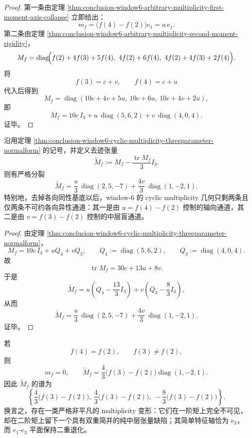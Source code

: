\begin{proof}
第一条由定理 \ref{thm:conclusion-window6-arbitrary-multiplicity-first-moment-axis-collapse} 立即给出：
\[
m_f=\bigl(f(4)-f(2)\bigr)e_1=u\,e_1.
\]
第二条由定理 \ref{thm:conclusion-window6-arbitrary-multiplicity-second-moment-rigidity}，
\[
M_f
=
\operatorname{diag}\!\Bigl(
f(2)+4f(3)+5f(4),\
4f(2)+6f(4),\
4f(2)+4f(3)+2f(4)
\Bigr).
\]
将
\[
f(3)=c+v,\qquad
f(4)=c+u
\]
代入后得到
\[
M_f
=
\operatorname{diag}(10c+4v+5u,\ 10c+6u,\ 10c+4v+2u),
\]
即
\[
M_f
=
10c\,I_3
+u\,\operatorname{diag}(5,6,2)
+v\,\operatorname{diag}(4,0,4).
\]
证毕。
\end{proof}

\begin{theorem}[去迹二阶矩的双通道分裂]\label{thm:conclusion-window6-cyclic-multiplicity-traceless-twochannel-splitting}
沿用定理 \ref{thm:conclusion-window6-cyclic-multiplicity-threeparameter-normalform} 的记号，并定义去迹张量
\[
\widetilde M_f:=M_f-\frac{\operatorname{tr}M_f}{3}I_3.
\]
则有严格分裂
\[
\widetilde M_f
=
\frac{u}{3}\,\operatorname{diag}(2,5,-7)
+\frac{4v}{3}\,\operatorname{diag}(1,-2,1).
\]
特别地，去掉各向同性基底以后，window-\(6\) 的 cyclic multiplicity 几何只剩两条且仅两条不可约各向异性通道：其一是由 \(u=f(4)-f(2)\) 控制的轴向通道，其二是由 \(v=f(3)-f(2)\) 控制的中层盲通道。
\end{theorem}

\begin{proof}
由定理 \ref{thm:conclusion-window6-cyclic-multiplicity-threeparameter-normalform}，
\[
M_f
=
10c\,I_3
+uQ_4
+vQ_3,
\qquad
Q_4:=\operatorname{diag}(5,6,2),
\qquad
Q_3:=\operatorname{diag}(4,0,4).
\]
故
\[
\operatorname{tr}M_f=30c+13u+8v.
\]
于是
\[
\widetilde M_f
=
u\!\left(Q_4-\frac{13}{3}I_3\right)
+v\!\left(Q_3-\frac{8}{3}I_3\right),
\]
从而
\[
\widetilde M_f
=
\frac{u}{3}\,\operatorname{diag}(2,5,-7)
+\frac{4v}{3}\,\operatorname{diag}(1,-2,1).
\]
证毕。
\end{proof}

\begin{corollary}[中层盲通道的双重简并]\label{cor:conclusion-window6-cyclic-multiplicity-middleblind-double-degeneracy}
若
\[
f(4)=f(2),\qquad f(3)\neq f(2),
\]
则
\[
m_f=0,
\qquad
\widetilde M_f
=
\frac{4}{3}\bigl(f(3)-f(2)\bigr)\operatorname{diag}(1,-2,1).
\]
因此 \(\widetilde M_f\) 的谱为
\[
\left\{
\frac{4}{3}\bigl(f(3)-f(2)\bigr),\
\frac{4}{3}\bigl(f(3)-f(2)\bigr),\
-\frac{8}{3}\bigl(f(3)-f(2)\bigr)
\right\}.
\]
换言之，存在一类严格非平凡的 multiplicity 变形：它们在一阶矩上完全不可见，却在二阶矩上留下一个具有双重简并的纯中层张量缺陷；其简单特征轴恰为 \(e_2\)，而 \(e_1\)-\(e_3\) 平面保持二重退化。
\end{corollary}

